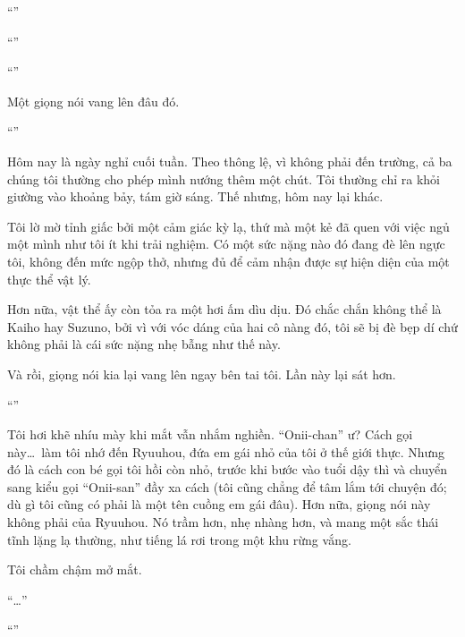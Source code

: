 \documentclass[../main.tex]{subfiles}
\begin{document}


``''

``''

``''

Một giọng nói vang lên đâu đó.

``''

Hôm nay là ngày nghỉ cuối tuần. Theo thông lệ, vì không phải đến trường, cả ba chúng tôi thường cho phép mình nướng thêm một chút. Tôi thường chỉ ra khỏi giường vào khoảng bảy, tám giờ sáng. Thế nhưng, hôm nay lại khác.

Tôi lờ mờ tỉnh giấc bởi một cảm giác kỳ lạ, thứ mà một kẻ đã quen với việc ngủ một mình như tôi ít khi trải nghiệm. Có một sức nặng nào đó đang đè lên ngực tôi, không đến mức ngộp thở, nhưng đủ để cảm nhận được sự hiện diện của một thực thể vật lý.

Hơn nữa, vật thể ấy còn tỏa ra một hơi ấm dìu dịu. Đó chắc chắn không thể là Kaiho hay Suzuno, bởi vì với vóc dáng của hai cô nàng đó, tôi sẽ bị đè bẹp dí chứ không phải là cái sức nặng nhẹ bẫng như thế này.

Và rồi, giọng nói kia lại vang lên ngay bên tai tôi. Lần này lại sát hơn.

``''

Tôi hơi khẽ nhíu mày khi mắt vẫn nhắm nghiền. ``Onii-chan'' ư? Cách gọi này\dots\ làm tôi nhớ đến Ryuuhou, đứa em gái nhỏ của tôi ở thế giới thực. Nhưng đó là cách con bé gọi tôi hồi còn nhỏ, trước khi bước vào tuổi dậy thì và chuyển sang kiểu gọi ``Onii-san'' đầy xa cách (tôi cũng chẳng để tâm lắm tới chuyện đó; dù gì tôi cũng có phải là một tên cuồng em gái đâu). Hơn nữa, giọng nói này không phải của Ryuuhou. Nó trầm hơn, nhẹ nhàng hơn, và mang một sắc thái tĩnh lặng lạ thường, như tiếng lá rơi trong một khu rừng vắng.

Tôi chầm chậm mở mắt.

``\dots''

``''
\end{document}
